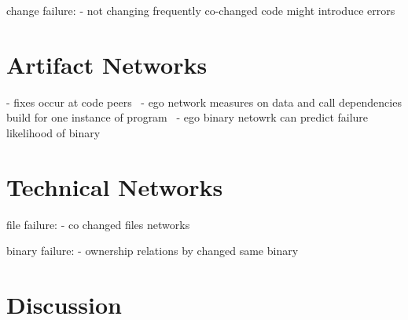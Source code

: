 change failure:
- not changing frequently co-changed code might introduce errors~\cite{zimmermann:icse:2004}


\section{Artifact Networks}
\label{chap:6:an}

- fixes occur at code peers~\cite{nguyen:icse:2010} 
- ego network measures on data and call dependencies build for one instance of program~\cite{zimmermann:icse:2008}
- ego binary netowrk can predict failure likelihood of binary~\cite{zimmermann:esem:2009}

\section{Technical Networks}
\label{chap:6:tn}
file failure:
- co changed files networks~\cite{meneely:fse:2008}

binary failure:
- ownership relations by changed same binary~\cite{pinzger:fse:2008}


\section{Discussion}
\label{chap:6:dis}
